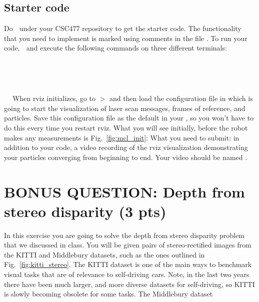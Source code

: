\documentclass[11pt, a4paper]{article}
\begin{document}
\subsection*{Starter code}
Do $\;$ under your CSC477 repository to get the starter code. The functionality that you need to implement is marked using comments in the file 
. To run your code, $\;$ and 
execute the following commands on three different terminals: 
\newline

   $\;$  $\;$ 
  
   $\;$  $\;$ 
  
   $\;$  $\;$  
\newline
\newline
\noindent When rviz initializes, go to  $>$  and then load the configuration file in 
which is going to start the visualization of laser scan messages, frames of reference, and particles. Save this configuration file as the default
in your , so you won't have to do this every time you restart rviz. What you will see initially, before the robot makes any measurements is Fig.~\ref{fig:mcl_init}:
\noindent What you need to submit: in addition to your code, a video recording of the rviz visualization demonstrating your particles converging from beginning to end. Your video 
should be named . 


\section{BONUS QUESTION: Depth from stereo disparity (3 pts)}
In this exercise you are going to solve the depth from stereo disparity problem that we discussed in class. You will be given pairs of stereo-rectified images from the 
KITTI and Middlebury datasets, such as the ones outlined in Fig.~\ref{fig:kitti_stereo}. The KITTI dataset is one of the main ways to benchmark visual tasks that are of relevance to self-driving cars. Note, in the last two years there have been much larger, and more diverse datasets for self-driving, so KITTI is slowly becoming obsolete for some tasks. 
The Middlebury dataset 
\end{document}
